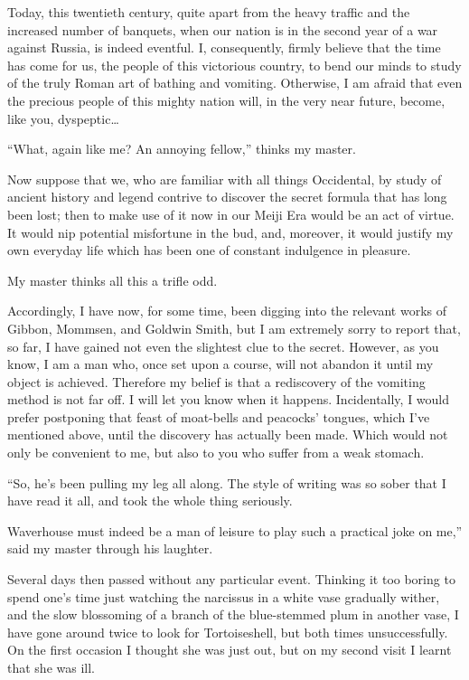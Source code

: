 \documentclass[12pt, openright]{book}
\begin{document}
Today, this twentieth century, quite apart from the heavy traffic and
the increased number of banquets, when our nation is in the second year
of a war against Russia, is indeed eventful. I, consequently, firmly
believe that the time has come for us, the people of this victorious
country, to bend our minds to study of the truly Roman art of bathing
and vomiting. Otherwise, I am afraid that even the precious people of
this mighty nation will, in the very near future, become, like you,
dyspeptic\ldots{}

``What, again like me? An annoying fellow,'' thinks my master.

Now suppose that we, who are familiar with all things Occidental, by
study of ancient history and legend contrive to discover the secret
formula that has long been lost; then to make use of it now in our Meiji
Era would be an act of virtue. It would nip potential misfortune in the
bud, and, moreover, it would justify my own everyday life which has been
one of constant indulgence in pleasure.

My master thinks all this a trifle odd.

Accordingly, I have now, for some time, been digging into the relevant
works of Gibbon, Mommsen, and Goldwin Smith, but I am extremely sorry to
report that, so far, I have gained not even the slightest clue to the
secret. However, as you know, I am a man who, once set upon a course,
will not abandon it until my object is achieved. Therefore my belief is
that a rediscovery of the vomiting method is not far off. I will let you
know when it happens. Incidentally, I would prefer postponing that feast
of moat-bells and peacocks' tongues, which I've mentioned above, until
the discovery has actually been made. Which would not only be convenient
to me, but also to you who suffer from a weak stomach.

``So, he's been pulling my leg all along. The style of writing was so
sober that I have read it all, and took the whole thing seriously.

Waverhouse must indeed be a man of leisure to play such a practical joke
on me,'' said my master through his laughter.

Several days then passed without any particular event. Thinking it too
boring to spend one's time just watching the narcissus in a white vase
gradually wither, and the slow blossoming of a branch of the
blue-stemmed plum in another vase, I have gone around twice to look for
Tortoiseshell, but both times unsuccessfully. On the first occasion I
thought she was just out, but on my second visit I learnt that she was
ill.
\end{document}
